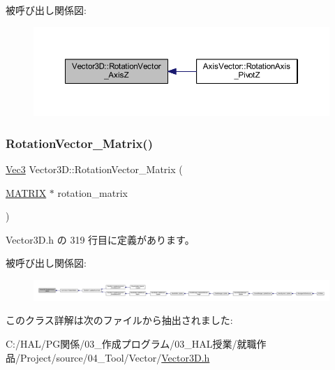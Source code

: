 被呼び出し関係図\+:
\nopagebreak
\begin{figure}[H]
\begin{center}
\leavevmode
\includegraphics[width=350pt]{class_vector3_d_ac893f738dde87e5981dcff5d5515ede6_icgraph}
\end{center}
\end{figure}
\mbox{\label{class_vector3_d_aa368719da4c1ac4e8a727edbd09ec390}} 
\subsubsection{\texorpdfstring{Rotation\+Vector\+\_\+\+Matrix()}{RotationVector\_Matrix()}}
{\footnotesize\ttfamily \mbox{\hyperlink{_vector3_d_8h_ab16f59e4393f29a01ec8b9bbbabbe65d}{Vec3}} Vector3\+D\+::\+Rotation\+Vector\+\_\+\+Matrix (\begin{DoxyParamCaption}\item[{\mbox{\hyperlink{_vector3_d_8h_a032295cd9fb1b711757c90667278e744}{M\+A\+T\+R\+IX}} $\ast$}]{rotation\+\_\+matrix }\end{DoxyParamCaption})\hspace{0.3cm}{\ttfamily [inline]}}



 Vector3\+D.\+h の 319 行目に定義があります。

被呼び出し関係図\+:
\nopagebreak
\begin{figure}[H]
\begin{center}
\leavevmode
\includegraphics[width=350pt]{class_vector3_d_aa368719da4c1ac4e8a727edbd09ec390_icgraph}
\end{center}
\end{figure}


このクラス詳解は次のファイルから抽出されました\+:\begin{DoxyCompactItemize}
\item 
C\+:/\+H\+A\+L/\+P\+G関係/03\+\_\+作成プログラム/03\+\_\+\+H\+A\+L授業/就職作品/\+Project/source/04\+\_\+\+Tool/\+Vector/\mbox{\hyperlink{_vector3_d_8h}{Vector3\+D.\+h}}\end{DoxyCompactItemize}
